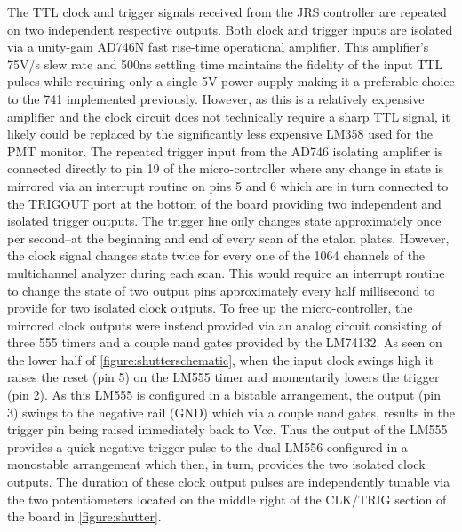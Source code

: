 The TTL clock and trigger signals received from the JRS controller are repeated on two independent respective outputs.  Both clock and trigger inputs are isolated via a unity-gain AD746N fast rise-time operational amplifier.  This amplifier's 75V/\textmu s slew rate and 500ns settling time maintains the fidelity of the input TTL pulses while requiring only a single 5V power supply making it a preferable choice to the 741 implemented previously.  However, as this is a relatively expensive amplifier and the clock circuit does not technically require a sharp TTL signal, it likely could be replaced by the significantly less expensive LM358 used for the PMT monitor.  The repeated trigger input from the AD746 isolating amplifier is connected directly to pin 19 of the micro-controller where any change in state is mirrored via an interrupt routine on pins 5 and 6 which are in turn connected to the TRIGOUT port at the bottom of the board providing two independent and isolated trigger outputs.  The trigger line only changes state approximately once per second--at the beginning and end of every scan of the etalon plates.  However, the clock signal changes state twice for every one of the 1064 channels of the multichannel analyzer during each scan.  This would require an interrupt routine to change the state of two output pins approximately every half millisecond to provide for two isolated clock outputs.  To free up the micro-controller, the mirrored clock outputs were instead provided via an analog circuit consisting of three 555 timers and a couple nand gates provided by the LM74132.  As seen on the lower half of \fig \ref{figure:shutterschematic}, when the input clock swings high it raises the reset (pin 5) on the LM555 timer and momentarily lowers the trigger (pin 2). As this LM555 is configured in a bistable arrangement, the output (pin 3) swings to the negative rail (GND) which via a couple nand gates, results in the trigger pin being raised immediately back to Vcc. Thus the output of the LM555 provides a quick negative trigger pulse to the dual LM556 configured in a monostable arrangement which then, in turn, provides the two isolated clock outputs.  The duration of these clock output pulses are independently tunable via the two potentiometers located on the middle right of the CLK/TRIG section of the board in \fig \ref{figure:shutter}. 

